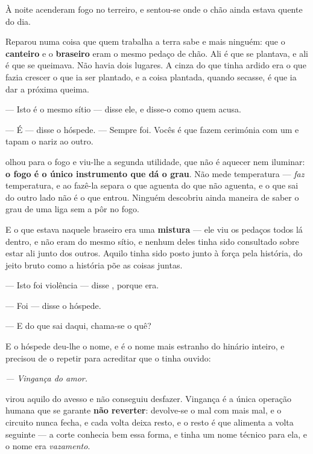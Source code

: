 \documentclass[livro.tex]{subfiles}
\begin{document}
À noite acenderam fogo no terreiro, e \Ben sentou-se onde o chão ainda estava
quente do dia.

\medskip
\noindent Reparou numa coisa que quem trabalha a terra sabe e mais ninguém: que
o \textbf{canteiro} e o \textbf{braseiro} eram o mesmo pedaço de chão. Ali é que
se plantava, e ali é que se queimava. Não havia dois lugares. A cinza do que
tinha ardido era o que fazia crescer o que ia ser plantado, e a coisa plantada,
quando secasse, é que ia dar a próxima queima.

\medskip
\noindent --- Isto é o mesmo sítio --- disse ele, e disse-o como quem acusa.

--- É --- disse o hóspede. --- Sempre foi. Vocês é que fazem cerimónia com um e
tapam o nariz ao outro.

\medskip
\noindent \Ben olhou para o fogo e viu-lhe a segunda utilidade, que não é
aquecer nem iluminar: \textbf{o fogo é o único instrumento que dá o grau}. Não
mede temperatura --- \emph{faz} temperatura, e ao fazê-la separa o que aguenta
do que não aguenta, e o que sai do outro lado não é o que entrou. Ninguém
descobriu ainda maneira de saber o grau de uma liga sem a pôr no fogo.

\medskip
\noindent E o que estava naquele braseiro era uma \textbf{mistura} --- ele viu
os pedaços todos lá dentro, e não eram do mesmo sítio, e nenhum deles tinha sido
consultado sobre estar ali junto dos outros. Aquilo tinha sido posto junto à
força pela história, do jeito bruto como a história põe as coisas juntas.

\medskip
\noindent --- Isto foi violência --- disse \Ben , porque era.

--- Foi --- disse o hóspede.

--- E do que sai daqui, chama-se o quê?

\medskip
\noindent E o hóspede deu-lhe o nome, e é o nome mais estranho do hinário
inteiro, e \Ben precisou de o repetir para acreditar que o tinha ouvido:

\begin{center}
\emph{--- Vingança do amor.}
\end{center}

\medskip
\noindent \Ben virou aquilo do avesso e não conseguiu desfazer. Vingança é a
única operação humana que se garante \textbf{não reverter}: devolve-se o mal com
mais mal, e o circuito nunca fecha, e cada volta deixa resto, e o resto é que
alimenta a volta seguinte --- a corte conhecia bem essa forma, e tinha um nome
técnico para ela, e o nome era \emph{vazamento}.
\end{document}

